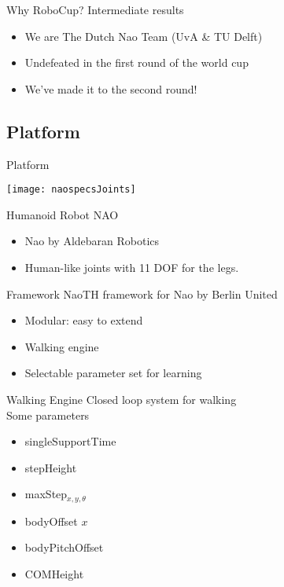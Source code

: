 \documentclass{beamer}
\begin{document}
\begin{frame}{Why RoboCup?}
	Intermediate results
	\begin{itemize}
		\item We are The Dutch Nao Team (UvA \& TU Delft)
		\item Undefeated in the first round of the world cup
		\item We've made it to the second round!
	\end{itemize}
\end{frame}

\subsection{Platform}
\begin{frame}{Platform}
	\begin{center}
		\texttt{[image: naospecsJoints]}
	\end{center}
	\begin{block}{Humanoid Robot NAO}
		\begin{itemize}
			\item Nao by Aldebaran Robotics
			\item Human-like joints with 11 DOF for the legs.
		\end{itemize}
	\end{block}
\end{frame}

\begin{frame}{Framework}
NaoTH framework for Nao by Berlin United \cite{naothdescription}
\begin{itemize}
\item Modular: easy to extend
\item Walking engine
\item Selectable parameter set for learning
\end{itemize}
\end{frame}

\begin{frame}{Walking Engine}
	Closed loop system for walking\\
	Some parameters
	\begin{itemize}
		\item singleSupportTime
		\item stepHeight
		\item maxStep$_{x, y, \theta}$
		\item bodyOffset $x$
		\item bodyPitchOffset
		\item COMHeight
	\end{itemize}
\end{frame}		
\end{document}
